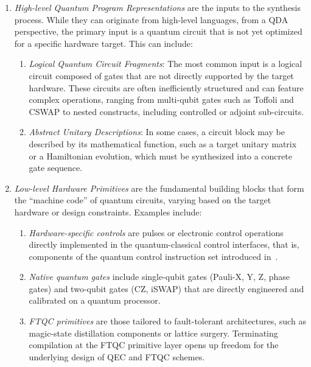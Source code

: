 \documentclass[a4paper,onecolumn,11pt,unpublished]{quantumarticle}
\begin{document}
\begin{enumerate}
\item \textit{High-level Quantum Program Representations} are the inputs to the synthesis process. While they can originate from high-level languages, from a QDA perspective, the primary input is a quantum circuit that is not yet optimized for a specific hardware target. This can include:
\begin{enumerate}
    \item \textit{Logical Quantum Circuit Fragments}: The most common input is a logical circuit composed of gates that are not directly supported by the target hardware. These circuits are often inefficiently structured and can feature complex operations, ranging from multi-qubit gates such as Toffoli and CSWAP to nested constructs, including controlled or adjoint sub-circuits.
    \item \textit{Abstract Unitary Descriptions}: In some cases, a circuit block may be described by its mathematical function, such as a target unitary matrix or a Hamiltonian evolution, which must be synthesized into a concrete gate sequence.
\end{enumerate}

\item \textit{Low-level Hardware Primitives} are the fundamental building blocks that form the ``machine code'' of quantum circuits, varying based on the target hardware or design constraints. Examples include:
\begin{enumerate}
    \item \textit{Hardware-specific controls} are pulses or electronic control operations directly implemented in the quantum-classical control interfaces, that is, components of the quantum control instruction set introduced in~.
    \item \textit{Native quantum gates} include single-qubit gates (Pauli-X, Y, Z, phase gates) and two-qubit gates (CZ, iSWAP) that are directly engineered and calibrated on a quantum processor.
    \item \textit{FTQC primitives} are those tailored to fault-tolerant architectures, such as magic-state distillation components or lattice surgery\cite{Litinski2019gameofsurfacecodes}. Terminating compilation at the FTQC primitive layer opens up freedom for the underlying design of QEC and FTQC schemes\cite{Watkins2024highperformance, beverlandAssessingRequirementsScale2022}.
\end{enumerate}
\end{enumerate} 
\end{document}
